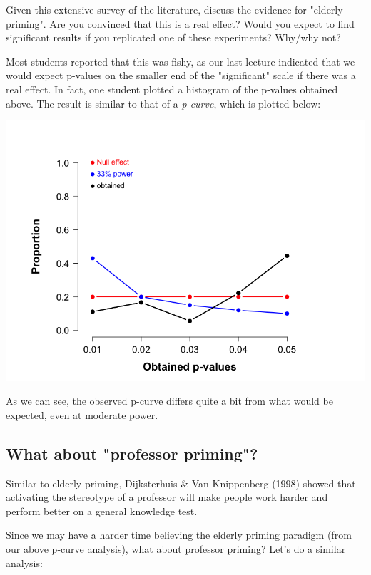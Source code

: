 \documentclass[11pt]{article}
\begin{document}
Given this extensive survey of the literature, discuss the evidence for "elderly priming".  Are you convinced that this is a real effect?  Would you expect to find significant results if you replicated one of these experiments?  Why/why not?

Most students reported that this was fishy, as our last lecture indicated that we would expect p-values on the smaller end of the "significant" scale if there was a real effect.  In fact, one student plotted a histogram of the p-values obtained above.  The result is similar to that of a \emph{p-curve}, which is plotted below:

\includegraphics[width=.9\linewidth]{figures/p-curve-elderly.png}

As we can see, the observed p-curve differs quite a bit from what would be expected, even at moderate power.

\subsection*{What about "professor priming"?}
\label{sec-1-2}

Similar to elderly priming, Dijksterhuis \& Van Knippenberg (1998) showed that activating the stereotype of a professor will make people work harder and perform better on a general knowledge test.

Since we may have a harder time believing the elderly priming paradigm (from our above p-curve analysis), what about professor priming?  Let's do a similar analysis:
\end{document}
